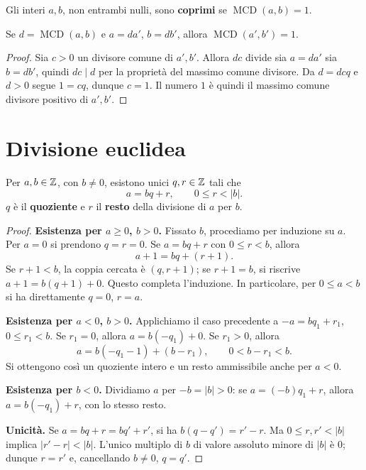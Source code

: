 \begin{definizione}
Gli interi $a,b$, non entrambi nulli, sono \textbf{coprimi} se $\operatorname{MCD}(a,b)=1$.
\end{definizione}

\begin{corollario}
Se $d=\operatorname{MCD}(a,b)$ e $a=da'$, $b=db'$, allora $\operatorname{MCD}(a',b')=1$.
\end{corollario}
\begin{proof}
Sia $c>0$ un divisore comune di $a',b'$. Allora $dc$ divide sia $a=da'$ sia $b=db'$, quindi $dc\mid d$ per la proprietà del massimo comune divisore. Da $d=dcq$ e $d>0$ segue $1=cq$, dunque $c=1$. Il numero $1$ è quindi il massimo comune divisore positivo di $a',b'$.
\end{proof}

\section{Divisione euclidea}
\begin{teorema}\label{teo:divisione}
Per $a,b\in\mathbb{Z}$, con $b\ne0$, esistono unici $q,r\in\mathbb{Z}$ tali che
\[
a=bq+r,\qquad 0\le r<|b|.
\]
$q$ è il \textbf{quoziente} e $r$ il \textbf{resto} della divisione di $a$ per $b$.
\end{teorema}
\begin{proof}
\textbf{Esistenza per $a\ge0$, $b>0$.} Fissato $b$, procediamo per induzione su $a$. Per $a=0$ si prendono $q=r=0$. Se $a=bq+r$ con $0\le r<b$, allora
\[
a+1=bq+(r+1).
\]
Se $r+1<b$, la coppia cercata è $(q,r+1)$; se $r+1=b$, si riscrive $a+1=b(q+1)+0$. Questo completa l'induzione. In particolare, per $0\le a<b$ si ha direttamente $q=0$, $r=a$.

\textbf{Esistenza per $a<0$, $b>0$.} Applichiamo il caso precedente a $-a=bq_1+r_1$, $0\le r_1<b$. Se $r_1=0$, allora $a=b(-q_1)+0$. Se $r_1>0$, allora
\[
a=b(-q_1-1)+(b-r_1),\qquad 0<b-r_1<b.
\]
Si ottengono così un quoziente intero e un resto ammissibile anche per $a<0$.

\textbf{Esistenza per $b<0$.} Dividiamo $a$ per $-b=|b|>0$: se $a=(-b)q_1+r$, allora $a=b(-q_1)+r$, con lo stesso resto.

\textbf{Unicità.} Se $a=bq+r=bq'+r'$, si ha $b(q-q')=r'-r$. Ma $0\le r,r'<|b|$ implica $|r'-r|<|b|$. L'unico multiplo di $b$ di valore assoluto minore di $|b|$ è $0$; dunque $r=r'$ e, cancellando $b\ne0$, $q=q'$.
\end{proof}

